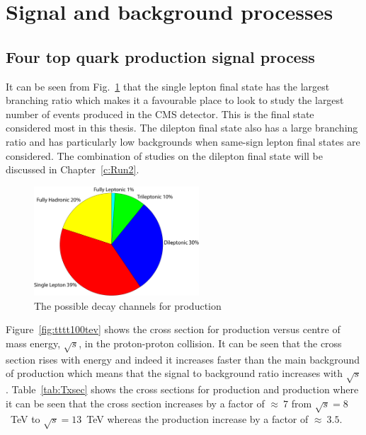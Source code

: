 \section{Signal and background processes}
\label{sec:sigback}

\subsection{Four top quark production signal process}
It can be seen from Fig.~\ref{fig:ttttDecay} that the single lepton final state has the largest branching ratio which makes it a favourable place to look to study the largest number of events produced in the CMS detector. This is the final state considered most in this thesis. The dilepton final state also has a large branching ratio and has particularly low backgrounds when same-sign lepton final states are considered. The combination of studies on the dilepton final state will be discussed in Chapter~\ref{c:Run2}.

\begin{figure}[ht!]
\centering
    \includegraphics[width=0.55\textwidth]{images/Analysis/FourTopBR.pdf}
    \caption{The possible decay channels for \tttt production}
    \label{fig:ttttDecay}
\end{figure}

Figure~\ref{fig:tttt100tev} shows the cross section for \tttt production versus centre of mass energy, $\sqrt{s}$, in the proton-proton collision. It can be seen that the cross section rises with energy and indeed it increases faster than the main background of \ttbar production which means that the signal to background ratio increases with $\sqrt{s}$. Table~\ref{tab:Txsec} shows the cross sections for \tttt production and \ttbar production where it can be seen that the \tttt cross section increases by a factor of $\approx~7$ from $\sqrt{s} = 8$~TeV to $\sqrt{s} = 13$~TeV whereas the \ttbar production increase by a factor of $\approx~3.5$.

